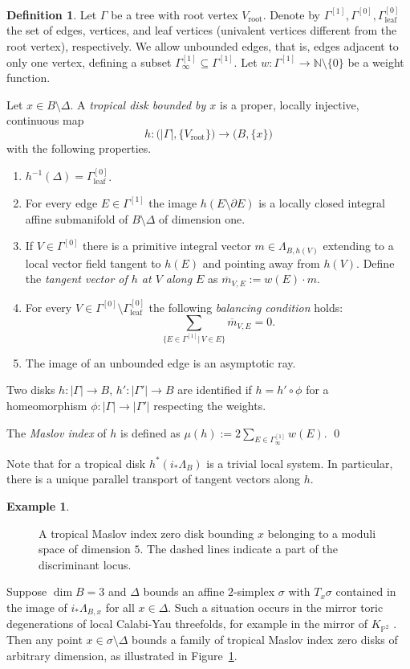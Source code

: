 \documentclass[11pt,letter]{amsart}
\theoremstyle{definition}
\newtheorem{definition}[theorem]{Definition}
\newtheorem{example}[theorem]{Example}
\theoremstyle{remark}
\numberwithin{equation}{section}
\numberwithin{figure}{section}
\newcommand {\leafvertices}  {\Gamma^{[0]}_{\mathrm{leaf}}}
\newcommand {\lra}  {\longrightarrow}
\newcommand {\rootvertex}  {V_{\mathrm{root}}}
\begin{document}
\begin{definition}
\label{def:disk}	
Let $\Gamma$ be a tree with root vertex $\rootvertex$. Denote by $\Gamma^{[1]},
\Gamma^{[0]}, \leafvertices$ the set of edges, vertices, and leaf vertices
(univalent vertices different from the root vertex), respectively. We allow
unbounded edges, that is, edges adjacent to only one vertex, defining a subset
$\Gamma_\infty^{[1]}\subseteq \Gamma^{[1]}$. Let $w: \Gamma^{[1]} \to
\mathbb{N}\setminus \{0\}$ be a weight function.

Let $x\in B\setminus \Delta$. A \emph{tropical disk bounded by $x$} is a proper,
locally injective, continuous map
\[
h: \big( |\Gamma|, \{\rootvertex\} \big) \lra \big(B,\{x\} \big)
\]
with the following properties.
\begin{enumerate}
\item
$h^{-1}(\Delta)= \leafvertices$.
\item
For every edge $E\in \Gamma^{[1]}$ the image $h(E\setminus\partial E)$ is a
locally closed integral affine submanifold of $B\setminus \Delta$ of dimension
one.
\item
If $V\in\Gamma^{[0]}$ there is a primitive integral vector $m\in
\Lambda_{B,h(V)}$ extending to a local vector field tangent to $h(E)$ and
pointing away from $h(V)$. Define the \emph{tangent vector of $h$ at $V$ along
$E$} as $\overline m_{V,E}:= w(E)\cdot m$.
\item 
For every $V\in \Gamma^{[0]}\setminus \leafvertices$ the following
\emph{balancing condition} holds:
\[
\sum_{\{E\in \Gamma^{[1]}| \,V\in E\} } \overline m_{V,E}= 0.
\]
\item 
The image of an unbounded edge is an asymptotic ray.
\end{enumerate}
Two disks $h: |\Gamma| \to B$, $h': |\Gamma'| \to B$ are identified if
$h=h'\circ \phi$ for a homeomorphism $\phi: |\Gamma|\to |\Gamma'|$ respecting
the weights.

The \emph{Maslov index} of $h$ is defined as $\displaystyle \mu(h):=
2\sum_{E\in\Gamma^{[1]}_\infty} w(E)$.
\qed
\end{definition}

Note that for a tropical disk $h^*(i_*\Lambda_B)$ is a trivial local system. In
particular, there is a unique parallel transport of tangent vectors along $h$.

\begin{example} \label{triangle}
\begin{figure}[h!] 

\caption{A tropical Maslov index zero disk bounding $x$ belonging to a moduli
space of dimension $5$. The dashed lines indicate a part of the discriminant
locus.}
\label{fig:moduli}
\end{figure}
Suppose $\dim B=3$ and $\Delta$ bounds an affine $2$-simplex $\sigma$ with
$T_x\sigma$ contained in the image of $i_*\Lambda_{B,x}$ for all $x\in \Delta$.
Such a situation occurs in the mirror toric degenerations of local Calabi-Yau
threefolds, for example in the mirror of $K_{\mathbb P^2}$
\cite[Expl.\,5.2]{Invitation}. Then any point $x\in \sigma \setminus \Delta$
bounds a family of tropical Maslov index zero disks of arbitrary dimension, as
illustrated in Figure~\ref{fig:moduli}.
\end{example}
\end{document}
